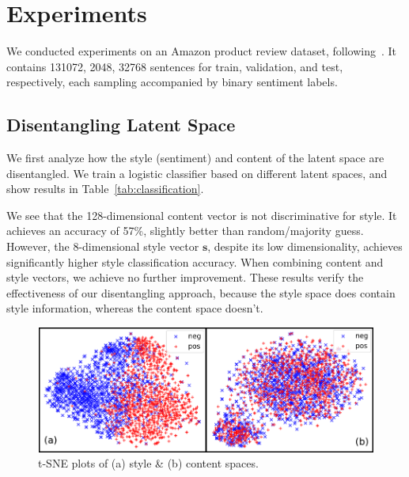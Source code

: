\documentclass[11pt,a4paper]{article}
\begin{document}
\section{Experiments}
We conducted experiments on an Amazon product review dataset, following~. It contains 131072, 2048, 32768 sentences for train, validation, and test, respectively, each sampling accompanied by binary sentiment labels.

\subsection{Disentangling Latent Space}


We first analyze how the style (sentiment) and content of the latent space are disentangled. We train a logistic classifier based on different latent spaces, and show results in Table~\ref{tab:classification}.

We see that the 128-dimensional content vector is not discriminative for style. It achieves an accuracy of 57\%, slightly better than random/majority guess. However, the 8-dimensional style vector $\bm s$, despite its low dimensionality, achieves significantly higher style classification accuracy. When combining content and style vectors, we achieve no further improvement. These results verify the effectiveness of our disentangling approach, because the style space does contain style information, whereas the content space doesn't.


\begin{table}[!t]
	\vspace{-.3cm}
	\centering
	\caption{Style classification accuracy.}
	\label{tab:classification}
\end{table}

\begin{figure}[!t]
	\includegraphics[width=\linewidth]{tsne-style-and-content}
	\vspace{-.9cm}
	\caption{t-SNE plots of (a) style \& (b) content spaces.}
	\label{fig:tsne}
	\vspace{-.3cm}
\end{figure}
\end{document}

